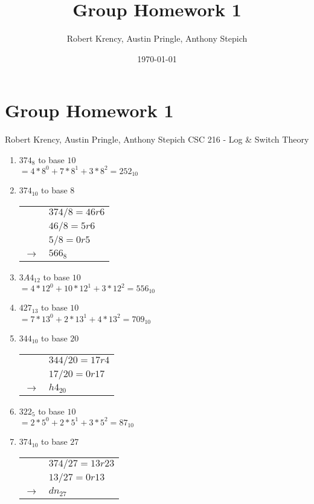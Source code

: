 \documentclass[12pt]{article}
\title{Group Homework 1}
\author{Robert Krency, Austin Pringle, Anthony Stepich}
\date{\today}
\begin{document}
\section*{Group Homework 1}
Robert Krency, Austin Pringle, Anthony Stepich
CSC 216 - Log & Switch Theory

\begin{enumerate}

    \item $374_8$ to base $10$ \\
    $= 4 * 8^0 + 7*8^1 + 3*8^2 = \boxed{252_{10}}$

    \item $374_{10}$ to base $8$ \\
    \begin{tabular}{l l}
        & $374 / 8 = 46  r6$ \\
        & $46 / 8 = 5  r6$ \\
        & $5 / 8 = 0  r5$ \\
        $\rightarrow$ & $\boxed{566_8}$ \\
    \end{tabular}
    
    
    \item $3A4_{12}$ to base $10$ \\
    $= 4 * 12^0 + 10*12^1 + 3*12^2 = \boxed{556_{10}}$
    

    \item $427_{13}$ to base $10$ \\
    $= 7 * 13^0 + 2*13^1 + 4*13^2 = \boxed{709_{10}}$
    

    \item $344_{10}$ to base $20$ \\
    \begin{tabular}{l l}
        & $344 / 20 = 17  r4$ \\
        & $17 / 20 = 0  r17$ \\
        $\rightarrow$ & $\boxed{h4_20}$ \\
    \end{tabular}
    

    \item $322_5$ to base $10$ \\
    $= 2 * 5^0 + 2*5^1 + 3*5^2 = \boxed{87_{10}}$
    

    \item $374_{10}$ to base $27$ \\
    \begin{tabular}{l l}
        & $374 / 27 = 13  r23$ \\
        & $13 / 27 = 0  r13$ \\
        $\rightarrow$ & $\boxed{dn_{27}}$ \\
    \end{tabular}
    


\end{enumerate}
\end{document}
